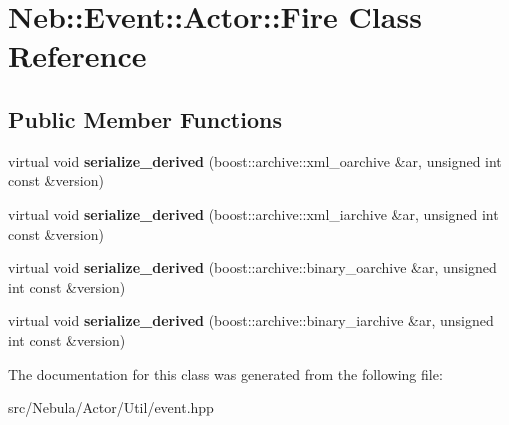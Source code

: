 \hypertarget{classNeb_1_1Event_1_1Actor_1_1Fire}{\section{\-Neb\-:\-:\-Event\-:\-:\-Actor\-:\-:\-Fire \-Class \-Reference}
\label{classNeb_1_1Event_1_1Actor_1_1Fire}
}
\subsection*{\-Public \-Member \-Functions}
\begin{DoxyCompactItemize}
\item 
\hypertarget{classNeb_1_1Event_1_1Actor_1_1Fire_aeeab712a8bc132bc4b119e05d47ba87d}{virtual void {\bfseries serialize\-\_\-derived} (boost\-::archive\-::xml\-\_\-oarchive \&ar, unsigned int const \&version)}\label{classNeb_1_1Event_1_1Actor_1_1Fire_aeeab712a8bc132bc4b119e05d47ba87d}

\item 
\hypertarget{classNeb_1_1Event_1_1Actor_1_1Fire_a2d0e2250cf3976238e8c4d623f0eea29}{virtual void {\bfseries serialize\-\_\-derived} (boost\-::archive\-::xml\-\_\-iarchive \&ar, unsigned int const \&version)}\label{classNeb_1_1Event_1_1Actor_1_1Fire_a2d0e2250cf3976238e8c4d623f0eea29}

\item 
\hypertarget{classNeb_1_1Event_1_1Actor_1_1Fire_aa09cae683af824389171eec336a054f7}{virtual void {\bfseries serialize\-\_\-derived} (boost\-::archive\-::binary\-\_\-oarchive \&ar, unsigned int const \&version)}\label{classNeb_1_1Event_1_1Actor_1_1Fire_aa09cae683af824389171eec336a054f7}

\item 
\hypertarget{classNeb_1_1Event_1_1Actor_1_1Fire_a026adc92ad9162573f5b0f87b4ac93bb}{virtual void {\bfseries serialize\-\_\-derived} (boost\-::archive\-::binary\-\_\-iarchive \&ar, unsigned int const \&version)}\label{classNeb_1_1Event_1_1Actor_1_1Fire_a026adc92ad9162573f5b0f87b4ac93bb}

\end{DoxyCompactItemize}


\-The documentation for this class was generated from the following file\-:\begin{DoxyCompactItemize}
\item 
src/\-Nebula/\-Actor/\-Util/event.\-hpp\end{DoxyCompactItemize}
